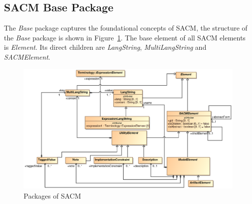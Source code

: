 \subsection{SACM Base Package}
\label{sec:basePack}
The \textit{Base} package captures the foundational concepts of SACM, the structure of the \textit{Base} package is shown in Figure~\ref{fig:base}. The base element of all SACM elements is \textit{Element}. Its direct children are \textit{LangString}, \textit{MultiLangString} and \textit{SACMElement}.
\begin{figure}
	\centering
	\includegraphics[width=1\linewidth]{fig/Base.eps}
	\caption{Packages of SACM}
	\label{fig:base}
\end{figure}

